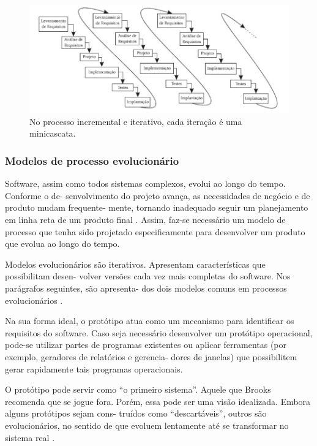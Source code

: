 \begin{figure}[H]
	\centering
	\includegraphics[scale=0.5]{imagens/interativo-incremental.png}
	\caption{No processo incremental e iterativo, cada iteração é uma minicascata. \cite{bezerra2016principios}}
	\label{fig:interativo-incremental}
\end{figure}

\subsubsection{Modelos de processo evolucionário}

Software, assim como todos sistemas complexos, evolui ao longo do tempo. Conforme o de- senvolvimento do projeto avança, as necessidades de negócio e de produto mudam frequente- mente, tornando inadequado seguir um planejamento em linha reta de um produto final \cite{pressman2016engenharia}. Assim, faz-se necessário um modelo de processo que tenha sido projetado especificamente para desenvolver um produto que evolua ao longo do tempo.

Modelos evolucionários são iterativos. Apresentam características que possibilitam desen- volver versões cada vez mais completas do software. Nos parágrafos seguintes, são apresenta- dos dois modelos comuns em processos evolucionários \cite{pressman2016engenharia}.


Na sua forma ideal, o protótipo atua como um mecanismo para identificar os requisitos do software. Caso seja necessário desenvolver um protótipo operacional, pode-se utilizar partes de programas existentes ou aplicar ferramentas (por exemplo, geradores de relatórios e gerencia- dores de janelas) que possibilitem gerar rapidamente tais programas operacionais.

O protótipo pode servir como “o primeiro sistema”. Aquele que Brooks recomenda que se jogue fora. Porém, essa pode ser uma visão idealizada. Embora alguns protótipos sejam cons- truídos como “descartáveis”, outros são evolucionários, no sentido de que evoluem lentamente até se transformar no sistema real \cite{pressman2016engenharia}.

